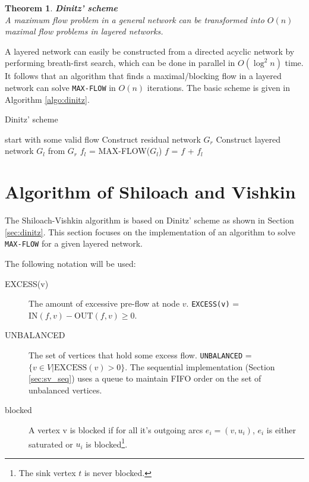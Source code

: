 \documentclass[a4paper,10pt, twocolumn]{article}
\newtheorem{theorem}[lemma]{Theorem}
\begin{document}
\begin{theorem}
\textbf{Dinitz' scheme} \cite{dinitz70} \\
A maximum flow problem in a general network can be transformed into $O(n)$ maximal flow problems in layered networks.
\end{theorem}

A layered network can easily be constructed from a directed acyclic network by performing breath-first search, which can be done in parallel in $O(\log^{2}n)$ time\cite{yossi81}. It follows that an algorithm that finds a maximal/blocking flow in a layered network can solve \lstinline|MAX-FLOW| in $O(n)$ iterations. The basic scheme is given in Algorithm \ref{algo:dinitz}.

\begin{algorithm}
\caption{Dinitz' scheme}
\label{algo:dinitz}
\begin{algorithmic}[1]
	\State start with some valid flow 
		\State Construct residual network $G_r$ %
		\State Construct layered network $G_l$ from $G_r$ %
		\State $f_l$ = MAX-FLOW($G_l$)  %
		\State $f$ = $f$ + $f_l$ %
	\EndWhile
	\EndFunction
\end{algorithmic}
\end{algorithm}

\section{Algorithm of Shiloach and Vishkin}
\label{sec:shiloach}
The Shiloach-Vishkin algorithm is based on Dinitz' scheme as shown in Section \ref{sec:dinitz}. This section focuses on the implementation of an algorithm to solve \lstinline|MAX-FLOW| for a given layered network.

The following notation will be used:
\begin{description}
	\item [EXCESS(v)] The amount of excessive pre-flow at node $v$. \lstinline|EXCESS(v)| = $\mathrm{IN}(f,v) - \mathrm{OUT}(f,v) \geq 0$.
	\item[UNBALANCED] The set of vertices that hold some excess flow. \lstinline|UNBALANCED| = $\{v \in V \lvert \mathrm{EXCESS}(v) > 0 \}$. The sequential implementation (Section \ref{sec:sv_seq}) uses a queue to maintain FIFO order on the set of unbalanced vertices.
	\item[blocked] A vertex v is blocked if for all it's outgoing arcs $e_i = (v, u_i)$, $e_i$ is either saturated or $u_i$ is blocked\footnote{The sink vertex $t$ is never blocked.}. 
\end{description}
	
\end{document}
